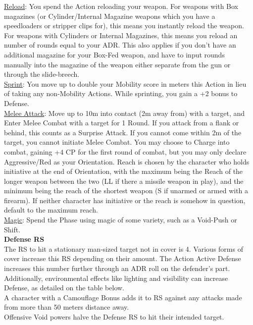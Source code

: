 \documentclass[a4paper, twocolumn, openany]{book}
\begin{document}
{\underline{Reload}: You spend the Action reloading your weapon. For weapons with Box magazines (or
Cylinder/Internal Magazine weapons which you have a speedloaders or stripper clips for), this
means you instantly reload the weapon. For weapons with Cylinders or Internal Magazines, this
means you reload an number of rounds equal to your ADR. This also applies if you don’t have
an additional magazine for your Box-Fed weapon, and have to input rounds manually into the
magazine of the weapon either separate from the gun or through the slide-breech.\\

\underline{Sprint}: You move up to double your Mobility score in meters this Action in lieu of taking any
non-Mobility Actions. While sprinting, you gain a +2 bonus to Defense.\\

\underline{Melee Attack}: Move up to 10m into contact (2m away from) with a target, and Enter Melee
Combat with a target for 1 Round. If you attack from a flank or behind, this counts as a Surprise
Attack. If you cannot come within 2m of the target, you cannot initiate Melee Combat. You may
choose to Charge into combat, gaining +4 CP for the first round of combat, but you may only
declare Aggressive/Red as your Orientation. Reach is chosen by the character who holds
initiative at the end of Orientation, with the maximum being the Reach of the longer weapon
between the two (LL if there a missile weapon in play), and the minimum being the reach of the
shortest weapon (S if unarmed or armed with a firearm). If neither character has initiative or the
reach is somehow in question, default to the maximum reach.\\

\underline{Magic}: Spend the Phase using magic of some variety, such as a Void-Push or Shift.\\

{\bfseries Defense RS\\}
The RS to hit a stationary man-sized target not in cover is 4. Various forms of cover increase
this RS depending on their amount. The Action Active Defense increases this number further
through an ADR roll on the defender’s part. Additionally, environmental effects like lighting and
visibility can increase Defense, as detailed on the table below.\\
A character with a Camouflage Bonus adds it to RS against any attacks made from more than
50 meters distance away.\\
Offensive Void powers halve the Defense RS to hit their intended target.\\

}
\end{document}
